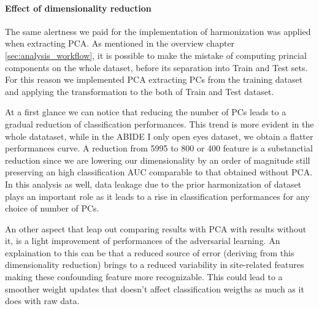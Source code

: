 \documentclass[11pt]{report}
\begin{document}


\paragraph{Effect of dimensionality reduction}
The same alertness we paid for the implementation of harmonization was applied when extracting PCA. As mentioned in the overview chapter \ref{sec:analysis_workflow}, it is possible to make the mistake of computing princial components on the whole dataset, before its separation into Train and Test sets.
For this reason we implemented PCA extracting PCs from the training dataset and applying the transformation to the both of Train and Test dataset.
\hfill

At a first glance we can notice that reducing the number of PCs leads to a gradual reduction of classification performances.
This trend is more evident in the whole datataset, while in the ABIDE I only open eyes dataset, we obtain a flatter performances curve.
A reduction from 5995 to 800 or 400 feature is a substanctial reduction since we are lowering our dimensionality by an order of magnitude still preserving an high classification AUC comparable to that obtained without PCA.
In this analysis as well, data leakage due to the prior harmonization of dataset plays an important role as it leads to a rise in classification performances for any choice of number of PCs.

An other aspect that leap out comparing results with PCA with results without it, is a light improvement of performances of the adversarial learning.
An explaination to this can be that a reduced source of error (deriving from this dimensionality reduction) brings to a reduced variability in site-related features making these confounding feature more recognizable. This could lead to a smoother weight updates that doesn't affect classification weigths as much as it does with raw data.
\end{document}
